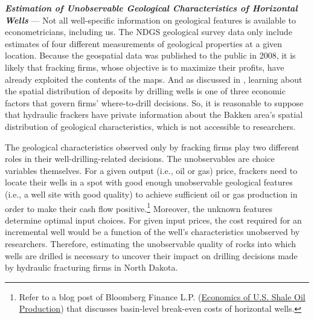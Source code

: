 \textit{\textbf{Estimation of Unobservable Geological Characteristics of Horizontal Wells}} --- Not all well-specific information on geological features is available to econometricians, including us. The NDGS geological survey data only include estimates of four different measurements of geological properties at a given location. Because the geospatial data was published to the public in 2008, it is likely that fracking firms, whose objective is to maximize their profits, have already exploited the contents of the maps. And as discussed in \cite{Learning-where-to-drill_Agerton_2020}, learning about the spatial distribution of deposits by drilling wells is one of three economic factors that govern firms' where-to-drill decisions. So, it is reasonable to suppose that hydraulic frackers have private information about the Bakken area's spatial distribution of geological characteristics, which is not accessible to researchers. 

The geological characteristics observed only by fracking firms play two different roles in their well-drilling-related decisions. The unobservables are choice variables themselves. For a given output (i.e., oil or gas) price, frackers need to locate their wells in a spot with good enough unobservable geological features (i.e., a well site with good quality) to achieve sufficient oil or gas production in order to make their cash flow positive.\footnote{Refer to a blog post of Bloomberg Finance L.P. (\href{https://about.bnef.com/blog/economics-u-s-shale-oil-production}{Economics of U.S. Shale Oil Production}) that discusses basin-level break-even costs of horizontal wells.} Moreover, the unknown features determine optimal input choices. For given input prices, the cost required for an incremental well would be a function of the well's characteristics unobserved by researchers. Therefore, estimating the unobservable quality of rocks into which wells are drilled is necessary to uncover their impact on drilling decisions made by hydraulic fracturing firms in North Dakota. 

